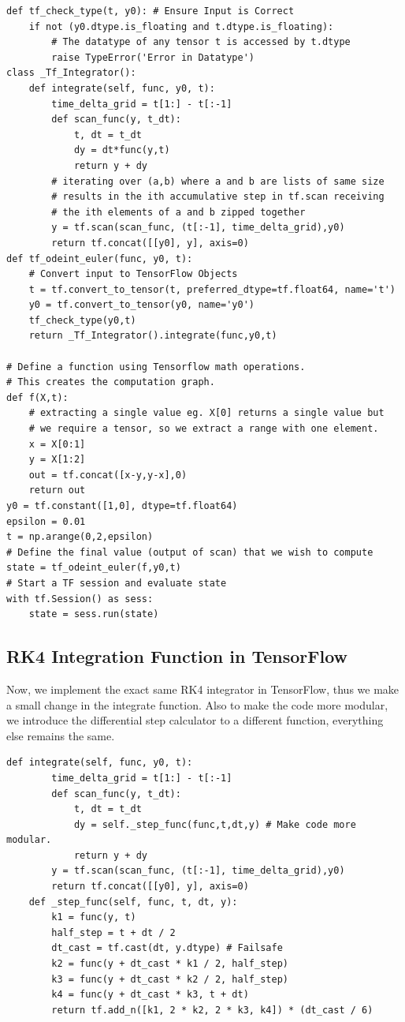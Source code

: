 \documentclass[10pt,letterpaper]{article}
\begin{document}
\begin{verbatim}
def tf_check_type(t, y0): # Ensure Input is Correct
    if not (y0.dtype.is_floating and t.dtype.is_floating): 
        # The datatype of any tensor t is accessed by t.dtype
        raise TypeError('Error in Datatype')
class _Tf_Integrator():
    def integrate(self, func, y0, t): 
        time_delta_grid = t[1:] - t[:-1]  
        def scan_func(y, t_dt): 
            t, dt = t_dt
            dy = dt*func(y,t)
            return y + dy
        # iterating over (a,b) where a and b are lists of same size
        # results in the ith accumulative step in tf.scan receiving
        # the ith elements of a and b zipped together
        y = tf.scan(scan_func, (t[:-1], time_delta_grid),y0) 
        return tf.concat([[y0], y], axis=0)
def tf_odeint_euler(func, y0, t):
    # Convert input to TensorFlow Objects
    t = tf.convert_to_tensor(t, preferred_dtype=tf.float64, name='t')
    y0 = tf.convert_to_tensor(y0, name='y0')
    tf_check_type(y0,t)
    return _Tf_Integrator().integrate(func,y0,t)
    
# Define a function using Tensorflow math operations. 
# This creates the computation graph.
def f(X,t):
    # extracting a single value eg. X[0] returns a single value but
    # we require a tensor, so we extract a range with one element.
    x = X[0:1] 
    y = X[1:2]
    out = tf.concat([x-y,y-x],0)
    return out
y0 = tf.constant([1,0], dtype=tf.float64)
epsilon = 0.01
t = np.arange(0,2,epsilon)
# Define the final value (output of scan) that we wish to compute
state = tf_odeint_euler(f,y0,t)
# Start a TF session and evaluate state
with tf.Session() as sess:
    state = sess.run(state)
\end{verbatim}

\subsection*{RK4 Integration Function in TensorFlow}

Now, we implement the exact same RK4 integrator in TensorFlow, thus we make a small change in the integrate function. Also to make the code more modular, we introduce the differential step calculator to a different function, everything else remains the same.

\begin{verbatim}
def integrate(self, func, y0, t): 
        time_delta_grid = t[1:] - t[:-1]
        def scan_func(y, t_dt): 
            t, dt = t_dt
            dy = self._step_func(func,t,dt,y) # Make code more modular.
            return y + dy
        y = tf.scan(scan_func, (t[:-1], time_delta_grid),y0)
        return tf.concat([[y0], y], axis=0)
    def _step_func(self, func, t, dt, y):
        k1 = func(y, t)
        half_step = t + dt / 2
        dt_cast = tf.cast(dt, y.dtype) # Failsafe
        k2 = func(y + dt_cast * k1 / 2, half_step)
        k3 = func(y + dt_cast * k2 / 2, half_step)
        k4 = func(y + dt_cast * k3, t + dt)
        return tf.add_n([k1, 2 * k2, 2 * k3, k4]) * (dt_cast / 6)
\end{verbatim}
\end{document}
